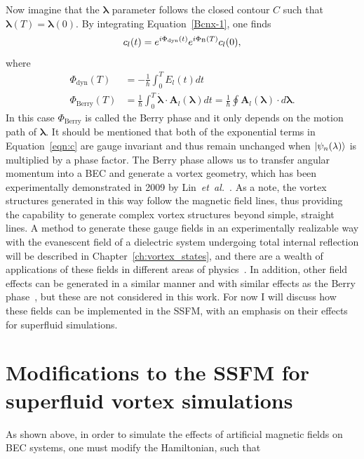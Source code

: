 Now imagine that the $\mathbf{\lambda}$ parameter follows the closed contour $C$ such that $\mathbf{\lambda}(T) = \mathbf{\lambda}(0)$. 
By integrating Equation~\eqref{Bcnx-1}, one finds
\begin{equation}
c_l(t) = e^{i \Phi_{\text{dyn}}(t)}e^{i\Phi_{\text B}(T)}c_l(0),
\label{eqn:c}
\end{equation}
where
\begin{equation}
\begin{split}
\Phi_{\text{dyn}}(T) &= - \frac{1}{\hbar}\int_0^TE_l(t)dt \\
\Phi_{\text{Berry}} (T)&= \frac{1}{\hbar} \int_0 ^T \dot{\mathbf{\lambda}} \cdot \mathbf{A}_l(\mathbf{\lambda})dt = \frac{1}{\hbar}\oint\mathbf{A}_l(\mathbf{\lambda}) \cdot d\mathbf{\lambda}.
\end{split}
\end{equation}
In this case $\Phi_{\text{Berry}}$ is called the Berry phase and it only depends on the motion path of $\mathbf{\lambda}$. 
It should be mentioned that both of the exponential terms in Equation~\eqref{eqn:c} are gauge invariant and thus remain unchanged when $\ket{\psi_n(\mathbf{\lambda})}$ is multiplied by a phase factor.
The Berry phase allows us to transfer angular momentum into a BEC and generate a vortex geometry, which 
has been experimentally demonstrated in 2009 by Lin~\textit{et~al.}~\cite{lin2009}.
As a note, the vortex structures generated in this way follow the magnetic field lines, thus providing the capability to generate complex vortex structures beyond simple, straight lines.
A method to generate these gauge fields in an experimentally realizable way with the evanescent field of a dielectric system undergoing total internal reflection will be described in Chapter~\ref{ch:vortex_states}, and there are a wealth of applications of these fields in different areas of physics~\cite{niu2017}.
In addition, other field effects can be generated in a similar manner and with similar effects as the Berry phase~\cite{wu2005}, but these are not considered in this work.
For now I will discuss how these fields can be implemented in the SSFM, with an emphasis on their effects for superfluid simulations.

\section{Modifications to the SSFM for superfluid vortex simulations}
\label{sec:implementation}

As shown above, in order to simulate the effects of artificial magnetic fields on BEC systems, one must modify the Hamiltonian, such that

